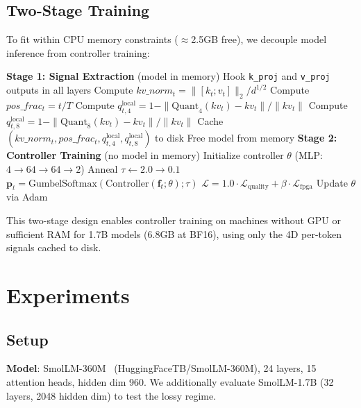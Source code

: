 \documentclass{article}
\begin{document}
\subsection{Two-Stage Training}

To fit within CPU memory constraints ($\approx$2.5GB free), we decouple model inference from controller training:

\begin{algorithm}[h]
\caption{Two-Stage Binary FPGA Controller Training}
\begin{algorithmic}[1]
\State \textbf{Stage 1: Signal Extraction} (model in memory)
\State Hook \texttt{k\_proj} and \texttt{v\_proj} outputs in all layers
    \State Compute $kv\_norm_t = \|[k_t; v_t]\|_2 / d^{1/2}$
    \State Compute $pos\_frac_t = t / T$
    \State Compute $q_{t,4}^\text{local} = 1 - \|\text{Quant}_4(kv_t) - kv_t\|/\|kv_t\|$
    \State Compute $q_{t,8}^\text{local} = 1 - \|\text{Quant}_8(kv_t) - kv_t\|/\|kv_t\|$
    \State Cache $(kv\_norm_t, pos\_frac_t, q_{t,4}^\text{local}, q_{t,8}^\text{local})$ to disk
  \EndFor
\EndFor
\State Free model from memory
\State \textbf{Stage 2: Controller Training} (no model in memory)
\State Initialize controller $\theta$ (MLP: $4{\to}64{\to}64{\to}2$)
  \State Anneal $\tau \leftarrow 2.0 \to 0.1$
    \State $\mathbf{p}_t = \text{GumbelSoftmax}(\text{Controller}(\mathbf{f}_t; \theta); \tau)$
    \State $\mathcal{L} = 1.0 \cdot \mathcal{L}_\text{quality} + \beta \cdot \mathcal{L}_\text{fpga}$
    \State Update $\theta$ via Adam
  \EndFor
\EndFor
\end{algorithmic}
\end{algorithm}

This two-stage design enables controller training on machines without GPU or sufficient RAM for 1.7B models (6.8GB at BF16), using only the 4D per-token signals cached to disk.

\section{Experiments}

\subsection{Setup}

\textbf{Model}: SmolLM-360M~\citep{smollm} (HuggingFaceTB/SmolLM-360M), 24 layers, 15 attention heads, hidden dim 960. We additionally evaluate SmolLM-1.7B (32 layers, 2048 hidden dim) to test the lossy regime.
\end{document}
